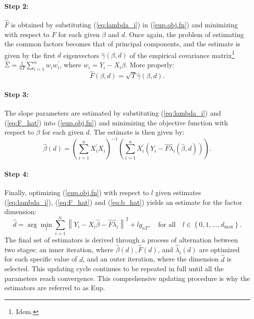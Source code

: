 \paragraph{Step 2:}  $\hat{F}$ is obtained by substituting (\ref{eq:lambda_i}) in (\ref{eup.obj.fn}) and minimizing with respect to $F$ for each given $\beta$ and $d$. Once again, the problem of estimating the common factors becomes that of principal components, and the estimate is given by the first $d$ eigenvectors $\hat{\gamma}(\beta, d)$  of the empirical covariance matrix\footnote{Idem.} $\hat{\Sigma} = \frac{1}{nT} \sum_{i=1}^n w_i w_i^\prime$, where $w_i = Y_i - X_i \beta$. More properly: 
\begin{equation}\label{eq:F_hat}
    \hat{F}(\beta, d)=\sqrt{T} \hat{\gamma}(\beta, d) .
\end{equation}
\paragraph{Step 3:} The slope parameters are estimated by substituting (\ref{eq:lambda_i}) and (\ref{eq:F_hat}) into (\ref{eup.obj.fn}) and minimizing the objective function with respect to $\beta$ for each given $d$. The estimate is then given by:
\begin{equation}\label{eq:b_hat}
    \hat{\beta}(d)=\left(\sum_{i=1}^n X_i^{\prime} X_i\right)^{-1}\left(\sum_{i=1}^n X_i^{\prime}\left(Y_i-\hat{F} \hat{\lambda}_i(\hat{\beta}, d)\right)\right) .
\end{equation}
\paragraph{Step 4:} Finally, optimizing (\ref{eup.obj.fn}) with respect to $l$ given estimates (\ref{eq:lambda_i}), (\ref{eq:F_hat}) and (\ref{eq:b_hat}) yields an estimate for the factor dimension: 
\begin{equation}
    \hat{d}=\arg \min_l \sum_{i=1}^n\left\|Y_i-X_i \hat{\beta}-\hat{F} \hat{\lambda}_i\right\|^2+l g_{n T}, \quad \text{for all} \quad l \in\left\{0,1, \ldots, d_{\max }\right\} .
\end{equation} 
The final set of estimators is derived through a process of alternation between two stages: an inner iteration, where \(\hat{\beta}(d), \hat{F}(d)\), and \(\hat{\lambda}_i(d)\) are optimized for each specific value of \(d\), and an outer iteration, where the dimension \(\hat{d}\) is selected. This updating cycle continues to be repeated in full until all the parameters reach convergence. This comprehensive updating procedure is why the estimators are referred to as \acl{Eup}.


